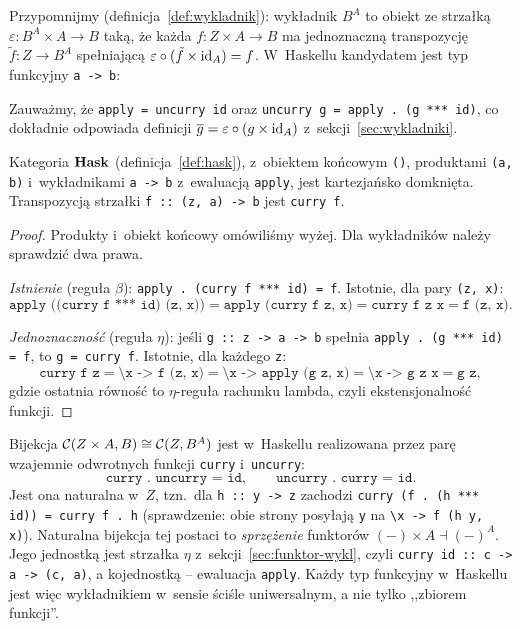 Przypomnijmy (definicja~\ref{def:wykladnik}): wykładnik $B^A$ to obiekt ze strzałką $\varepsilon\colon B^A\times A\to B$ taką, że każda $f\colon Z\times A\to B$ ma jednoznaczną transpozycję $\tilde f\colon Z\to B^A$ spełniającą $\varepsilon\circ(\tilde f\times\mathrm{id}_A) = f$. W~Haskellu kandydatem jest typ funkcyjny \lstinline{a -> b}:
Zauważmy, że \lstinline{apply = uncurry id} oraz \lstinline{uncurry g = apply . (g *** id)}, co dokładnie odpowiada definicji $\overline{g} = \varepsilon\circ(g\times\mathrm{id}_A)$ z~sekcji~\ref{sec:wykladniki}.

\begin{twierdzenie}\label{tw:hask-ccc}
Kategoria $\mathbf{Hask}$ (definicja~\ref{def:hask}), z~obiektem końcowym \lstinline{()}, produktami \lstinline{(a, b)} i~wykładnikami \lstinline{a -> b} z~ewaluacją \lstinline{apply}, jest kartezjańsko domknięta. Transpozycją strzałki \lstinline{f :: (z, a) -> b} jest \lstinline{curry f}.
\end{twierdzenie}

\begin{proof}
Produkty i~obiekt końcowy omówiliśmy wyżej. Dla wykładników należy sprawdzić dwa prawa.

\emph{Istnienie} (reguła $\beta$): \lstinline{apply . (curry f *** id) = f}. Istotnie, dla pary \lstinline{(z, x)}:
\[
\texttt{apply ((curry f *** id) (z, x))} = \texttt{apply (curry f z, x)} = \texttt{curry f z x} = \texttt{f (z, x)}.
\]

\emph{Jednoznaczność} (reguła $\eta$): jeśli \lstinline{g :: z -> a -> b} spełnia \lstinline{apply . (g *** id) = f}, to \lstinline{g = curry f}. Istotnie, dla każdego \lstinline{z}:
\[
\texttt{curry f z} = \texttt{\textbackslash x -> f (z, x)} = \texttt{\textbackslash x -> apply (g z, x)} = \texttt{\textbackslash x -> g z x} = \texttt{g z},
\]
gdzie ostatnia równość to $\eta$-reguła rachunku lambda, czyli ekstensjonalność funkcji.
\end{proof}

\begin{uwaga}
Bijekcja $\mathcal{C}(Z\times A, B)\cong\mathcal{C}(Z, B^A)$ jest w~Haskellu realizowana przez parę wzajemnie odwrotnych funkcji \lstinline{curry} i~\lstinline{uncurry}:
\[
\texttt{curry . uncurry = id}, \qquad \texttt{uncurry . curry = id}.
\]
Jest ona naturalna w~$Z$, tzn.\ dla \lstinline{h :: y -> z} zachodzi
\lstinline{curry (f . (h *** id)) = curry f . h}
(sprawdzenie: obie strony posyłają \lstinline{y} na \lstinline{\x -> f (h y, x)}). Naturalna bijekcja tej postaci to \emph{sprzężenie} funktorów $(-)\times A\dashv(-)^A$. Jego jednostką jest strzałka $\eta$ z~sekcji~\ref{sec:funktor-wykl}, czyli \lstinline{curry id :: c -> a -> (c, a)}, a kojednostką -- ewaluacja \lstinline{apply}. Każdy typ funkcyjny w~Haskellu jest więc wykładnikiem w~sensie ściśle uniwersalnym, a nie tylko ,,zbiorem funkcji''.
\end{uwaga}

